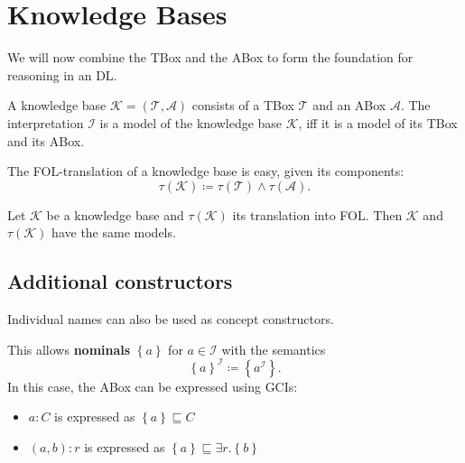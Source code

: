\newpage
\section{Knowledge Bases}
We will now combine the TBox and the ABox to form the foundation for reasoning in an DL.
\begin{definition}
	A knowledge base $\mathcal{K} = (\mathcal{T}, \mathcal{A})$ consists of a TBox $\mathcal{T}$ and an ABox $\mathcal{A}$.
	The interpretation $\mathcal{I}$ is a model of the knowledge base $\mathcal{K}$, iff it is a model of its TBox and its ABox.
\end{definition}
The FOL-translation of a knowledge base is easy, given its components:
\[
\tau(\mathcal{K}) \coloneqq \tau(\mathcal{T}) \land \tau(\mathcal{A})
.\] 
\begin{lemma}
	Let $\mathcal{K}$ be a knowledge base and $\tau(\mathcal{K})$ its translation into FOL.
	Then $\mathcal{K}$ and $\tau(\mathcal{K})$ have the same models.
\end{lemma}

\subsection{Additional constructors}
Individual names can also be used as concept constructors.
\begin{definition*}
	This allows \textbf{nominals} $\left\{ a \right\} $ for $a \in \mathscr{I}$ with the semantics
	\[
	\left\{ a \right\} ^{\mathcal{I}} \coloneqq \left\{ a^{\mathcal{I}} \right\} 
	.\] 
	In this case, the ABox can be expressed using GCIs:
	\begin{itemize}
		\item $a:C$ is expressed as $\left\{ a \right\} \sqsubseteq C$
		\item $(a,b):r$ is expressed as $\left\{ a \right\} \sqsubseteq \exists r.\left\{ b \right\} $
	\end{itemize}
\end{definition*}

\newpage
